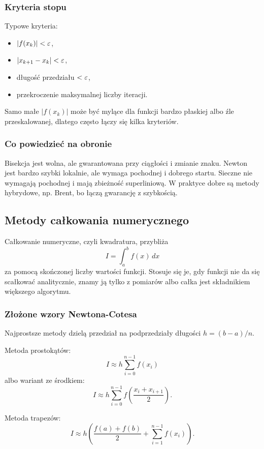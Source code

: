 \subsubsection{Kryteria stopu}

Typowe kryteria:
\begin{itemize}
  \item $|f(x_k)|<\varepsilon$,
  \item $|x_{k+1}-x_k|<\varepsilon$,
  \item długość przedziału $<\varepsilon$,
  \item przekroczenie maksymalnej liczby iteracji.
\end{itemize}
Samo małe $|f(x_k)|$ może być mylące dla funkcji bardzo płaskiej albo źle przeskalowanej, dlatego często łączy się kilka kryteriów.

\subsubsection{Co powiedzieć na obronie}

Bisekcja jest wolna, ale gwarantowana przy ciągłości i zmianie znaku. Newton jest bardzo szybki lokalnie, ale wymaga pochodnej i dobrego startu. Sieczne nie wymagają pochodnej i mają zbieżność superliniową. W praktyce dobre są metody hybrydowe, np. Brent, bo łączą gwarancję z szybkością.

\subsection{Metody całkowania numerycznego}

Całkowanie numeryczne, czyli kwadratura, przybliża
\[
I=\int_a^b f(x)\,dx
\]
za pomocą skończonej liczby wartości funkcji. Stosuje się je, gdy funkcji nie da się scałkować analitycznie, znamy ją tylko z pomiarów albo całka jest składnikiem większego algorytmu.

\subsubsection{Złożone wzory Newtona-Cotesa}

Najprostsze metody dzielą przedział na podprzedziały długości $h=(b-a)/n$.

Metoda prostokątów:
\[
I\approx h\sum_{i=0}^{n-1} f(x_i)
\]
albo wariant ze środkiem:
\[
I\approx h\sum_{i=0}^{n-1} f\left(\frac{x_i+x_{i+1}}{2}\right).
\]

Metoda trapezów:
\[
I\approx h\left(\frac{f(a)+f(b)}{2}+\sum_{i=1}^{n-1}f(x_i)\right).
\]

